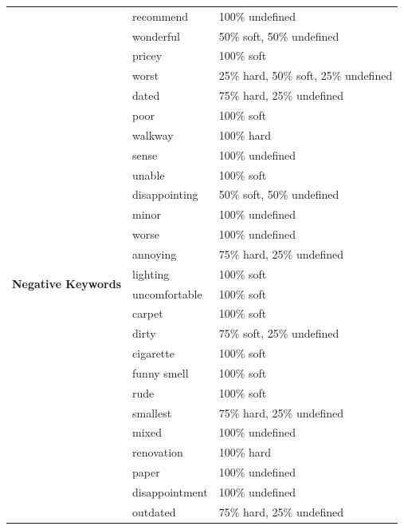 \documentclass[smallextended,natbib]{svjour3}       %
\begin{document}
\begin{table}[ht]
{\begin{tabular}{|c|l|l|}
       & recommend      & 100\% undefined                      \\ \cline{2-3} 
       & wonderful      & 50\% soft, 50\% undefined            \\ \hline
      \multirow{24}{*}{\textbf{Negative Keywords}} & pricey                                & 100\% soft                                       \\ \cline{2-3} 
       & worst          & 25\% hard, 50\% soft, 25\% undefined \\ \cline{2-3} 
       & dated          & 75\% hard, 25\% undefined            \\ \cline{2-3} 
       & poor           & 100\% soft                           \\ \cline{2-3} 
       & walkway        & 100\% hard                           \\ \cline{2-3} 
       & sense          & 100\% undefined                      \\ \cline{2-3} 
       & unable         & 100\% soft                           \\ \cline{2-3} 
       & disappointing  & 50\% soft, 50\% undefined            \\ \cline{2-3} 
       & minor          & 100\% undefined                      \\ \cline{2-3} 
       & worse          & 100\% undefined                      \\ \cline{2-3} 
       & annoying       & 75\% hard, 25\% undefined            \\ \cline{2-3} 
       & lighting       & 100\% soft                           \\ \cline{2-3} 
       & uncomfortable  & 100\% soft                           \\ \cline{2-3} 
       & carpet         & 100\% soft                           \\ \cline{2-3} 
       & dirty          & 75\% soft, 25\% undefined            \\ \cline{2-3} 
       & cigarette      & 100\% soft                           \\ \cline{2-3} 
       & funny smell    & 100\% soft                           \\ \cline{2-3} 
       & rude           & 100\% soft                           \\ \cline{2-3} 
       & smallest       & 75\% hard, 25\% undefined            \\ \cline{2-3} 
       & mixed          & 100\% undefined                      \\ \cline{2-3} 
       & renovation     & 100\% hard                           \\ \cline{2-3} 
       & paper          & 100\% undefined                      \\ \cline{2-3} 
       & disappointment & 100\% undefined                      \\ \cline{2-3} 
       & outdated       & 75\% hard, 25\% undefined            \\ \hline
      \end{tabular}%
      }
  \end{table}
\end{document}
